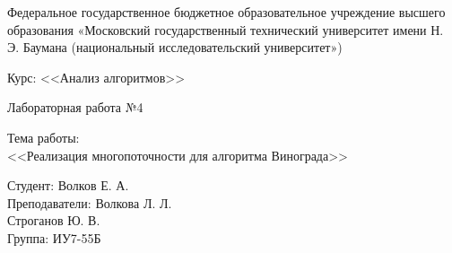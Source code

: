 \documentclass[a4paper,12pt]{article}
\begin{document}



\large
\begin{center}
Федеральное государственное бюджетное образовательное учреждение высшего образования «Московский государственный технический университет имени Н. Э. Баумана (национальный исследовательский университет»)
\end{center}

\vspace*{30mm} 

\LARGE
\begin{center}
Курс: <<Анализ алгоритмов>>

Лабораторная работа №4
\end{center}

\vspace*{30mm} 

\huge
\begin{center}
Тема работы:\\
<<Реализация многопоточности для алгоритма Винограда>>
\end{center}
\vspace*{30mm} 

\large
\begin{flushright}
Студент: Волков Е. А. \\
Преподаватели: Волкова Л. Л. \\
				Строганов Ю. В. \\
Группа: ИУ7-55Б
\end{flushright}
\end{document}

